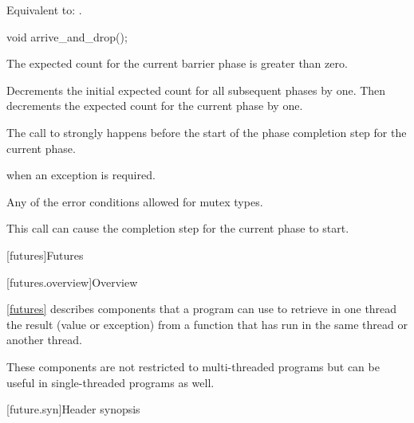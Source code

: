 \begin{itemdescr}
\pnum
\effects
Equivalent to: .
\end{itemdescr}

%
\begin{itemdecl}
void arrive_and_drop();
\end{itemdecl}

\begin{itemdescr}
\pnum
\expects
The expected count for the current barrier phase is greater than zero.

\pnum
\effects
Decrements the initial expected count for all subsequent phases by one.
Then decrements the expected count for the current phase by one.

\pnum
\sync
The call to  strongly happens before
the start of the phase completion step for the current phase.

\pnum
\throws
{} when an exception is required.

\pnum
\errors
Any of the error conditions
allowed for mutex types.

\pnum
\begin{note}
This call can cause the completion step for the current phase to start.
\end{note}
\end{itemdescr}

[futures]{Futures}

[futures.overview]{Overview}

\pnum
\ref{futures} describes components that a \Cpp{} program can use to retrieve in one thread the
result (value or exception) from a function that has run in the same thread or another thread.
\begin{note}
These components are not restricted to multi-threaded programs but can be useful in
single-threaded programs as well.
\end{note}

[future.syn]{Header  synopsis}


